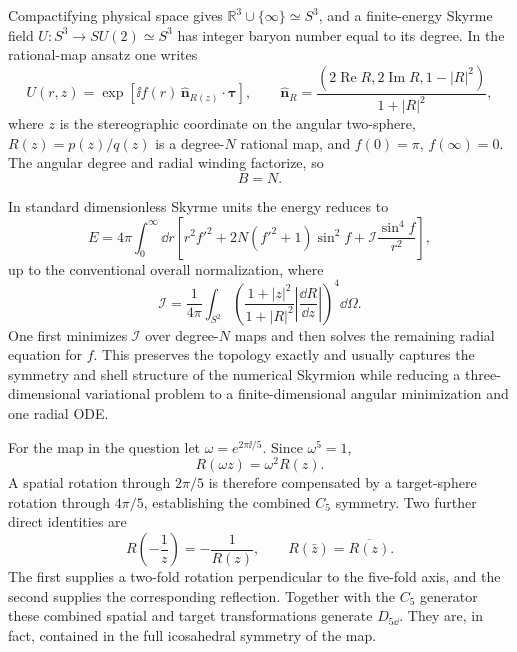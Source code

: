 \begin{enumerate}
  Compactifying physical space gives
  \(\mathbb R^3\cup\{\infty\}\simeq S^3\), and a finite-energy Skyrme
  field \(U:S^3\to SU(2)\simeq S^3\) has integer baryon number equal to
  its degree.  In the rational-map ansatz one writes
  \[
    U(r,z)=\exp\!\left[\ii f(r)\,
      \widehat{\mathbf n}_{R(z)}\cdot\boldsymbol\tau\right],
    \qquad
    \widehat{\mathbf n}_{R}
      =\frac{(2\operatorname{Re}R,2\operatorname{Im}R,1-|R|^2)}
             {1+|R|^2},
  \]
  where \(z\) is the stereographic coordinate on the angular two-sphere,
  \(R(z)=p(z)/q(z)\) is a degree-\(N\) rational map, and
  \(f(0)=\pi\), \(f(\infty)=0\).  The angular degree and radial winding
  factorize, so
  \[
    \boxed{B=N.}
  \]

  In standard dimensionless Skyrme units the energy reduces to
  \[
    E=4\pi\int_0^\infty \dd r\left[
      r^2f'^2+2N(f'^2+1)\sin^2f
      +\mathcal I\frac{\sin^4f}{r^2}\right],
  \]
  up to the conventional overall normalization, where
  \[
    \mathcal I=\frac1{4\pi}\int_{S^2}
      \left(\frac{1+|z|^2}{1+|R|^2}
        \left|\frac{\dd R}{\dd z}\right|\right)^4\dd\Omega.
  \]
  One first minimizes \(\mathcal I\) over degree-\(N\) maps and then
  solves the remaining radial equation for \(f\).  This preserves the
  topology exactly and usually captures the symmetry and shell structure
  of the numerical Skyrmion while reducing a three-dimensional variational
  problem to a finite-dimensional angular minimization and one radial ODE.

  For the map in the question let
  \(\omega=e^{2\pi \ii/5}\).  Since \(\omega^5=1\),
  \[
    R(\omega z)=\omega^2R(z).
  \]
  A spatial rotation through \(2\pi/5\) is therefore compensated by a
  target-sphere rotation through \(4\pi/5\), establishing the combined
  \(C_5\) symmetry.  Two further direct identities are
  \[
    R\!\left(-\frac1z\right)=-\frac1{R(z)},
    \qquad
    R(\bar z)=\overline{R(z)}.
  \]
  The first supplies a two-fold rotation perpendicular to the five-fold
  axis, and the second supplies the corresponding reflection.  Together
  with the \(C_5\) generator these combined spatial and target
  transformations generate \(D_{5\dd}\).  They are, in fact, contained in
  the full icosahedral symmetry of the map.


\end{enumerate}
